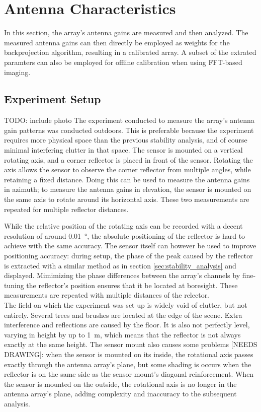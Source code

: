 \newblock
\section{Antenna Characteristics}
\label{sec:calibration}

In this section, the array's antenna gains are measured and then analyzed.
The measured antenna gains can then directly be employed as weights for the backprojection algorithm,
resulting in a calibrated array.
A subset of the extrated paramters can also be employed for offline calibration when using FFT-based imaging.

\subsection{Experiment Setup}
TODO: include photo
The experiment conducted to measure the array's antenna gain patterns was conducted outdoors.
This is preferable because the experiment requires more physical space than the previous stability analysis, 
and of course minimal interfering clutter in that space.
The sensor is mounted on a vertical rotating axis, and a corner reflector is placed in front of the sensor.
Rotating the axis allows the sensor to observe the corner reflector from multiple angles, while retaining a fixed distance.
Doing this can be used to measure the antenna gains in azimuth;
to measure the antenna gains in elevation, the sensor is mounted on the same axis to rotate around its horizontal axis.
These two measurements are repeated for multiple reflector distances.

While the relative position of the rotating axis can be recorded with a decent resolution of around \SI{0.01}{\degree},
the absolute positioning of the reflector is hard to achieve with the same accuracy.
The sensor itself can however be used to improve positioning accuracy:
during setup, the phase of the peak caused by the reflector
is extracted with a similar method as in section \ref{sec:stability_analysis} and displayed.
Mimimizing the phase differences between the array's channels by fine-tuning the reflector's position
ensures that it be located at boresight.
These measurements are repeated with multiple distances of the relector.\\

The field on which the experiment was set up is widely void of clutter, but not entirely.
Several trees and brushes are located at the edge of the scene.
Extra interference and reflections are caused by the floor.
It is also not perfectly level, varying in height by up to \SI{1}{\meter},
which means that the reflector is not always exactly at the same height.
The sensor mount also causes some problems [NEEDS DRAWING]:
when the sensor is mounted on its inside,
the rotational axis passes exactly through the antenna array's plane,
but some shading is occurs when the reflector is on the same side as the sensor mount's diagonal reinforcement.
When the sensor is mounted on the outside,
the rotational axis is no longer in the antenna array's plane,
adding complexity and inaccuracy to the subsequent analysis.

